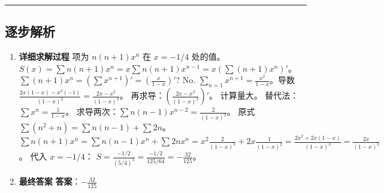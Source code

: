 \documentclass[UTF8]{ctexart}
\newenvironment{redenv}{\color{red}}{}
\newenvironment{detailedanalysis}{%
    \color{red}
    \begin{enumerate}[label=\textbf{第\arabic*步：}, leftmargin=*, align=left, itemsep=1.5ex]
}{%
    \end{enumerate}
}
\newcommand{\analysisrule}{\noindent\rule{\textwidth}{0.8pt}\vspace{-0.8em}}
\begin{document}
\begin{redenv}
\analysisrule
\subsection*{逐步解析}

\begin{detailedanalysis}
\item \textbf{详细求解过程}
项为 $n(n+1) x^n$ 在 $x = -1/4$ 处的值。
$S(x) = \sum n(n+1) x^n = x \sum n(n+1) x^{n-1} = x (\sum (n+1) x^n)'$。
$\sum (n+1) x^n = (\sum x^{n+1})' = (\frac{x}{1-x})'$? No.
$\sum_{n=1} x^{n+1} = \frac{x^2}{1-x}$。导数 $\frac{2x(1-x) - x^2(-1)}{(1-x)^2} = \frac{2x-x^2}{(1-x)^2}$。
再求导：$(\frac{2x-x^2}{(1-x)^2})'$。
计算量大。
替代法：$\sum x^n = \frac{1}{1-x}$。
求导两次：$\sum n(n-1) x^{n-2} = \frac{2}{(1-x)^3}$。
原式 $\sum (n^2+n) = \sum n(n-1) + \sum 2n$。
$\sum n(n+1) x^n = \sum n(n-1)x^n + \sum 2n x^n = x^2 \frac{2}{(1-x)^3} + 2x \frac{1}{(1-x)^2} = \frac{2x^2 + 2x(1-x)}{(1-x)^3} = \frac{2x}{(1-x)^3}$。
代入 $x = -1/4$：
$S = \frac{-1/2}{(5/4)^3} = \frac{-1/2}{125/64} = -\frac{32}{125}$。

\item \textbf{最终答案}
\textbf{答案}：$ -\frac{32}{125} $
\end{detailedanalysis}
\end{redenv}
\end{document}
